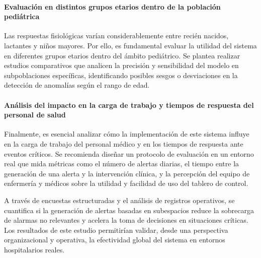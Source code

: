 \paragraph{Evaluación en distintos grupos etarios dentro de la población pediátrica}

Las respuestas fisiológicas varían considerablemente entre recién nacidos, lactantes y niños mayores. Por ello, es fundamental evaluar la utilidad del sistema en diferentes grupos etarios dentro del ámbito pediátrico. Se plantea realizar estudios comparativos que analicen la precisión y sensibilidad del modelo en subpoblaciones específicas, identificando posibles sesgos o desviaciones en la detección de anomalías según el rango de edad.

\paragraph{Análisis del impacto en la carga de trabajo y tiempos de respuesta del personal de salud}

Finalmente, es esencial analizar cómo la implementación de este sistema influye en la carga de trabajo del personal médico y en los tiempos de respuesta ante eventos críticos. Se recomienda diseñar un protocolo de evaluación en un entorno real que mida métricas como el número de alertas diarias, el tiempo entre la generación de una alerta y la intervención clínica, y la percepción del equipo de enfermería y médicos sobre la utilidad y facilidad de uso del tablero de control.

A través de encuestas estructuradas y el análisis de registros operativos, se cuantifica si la generación de alertas basadas en subespacios reduce la sobrecarga de alarmas no relevantes y acelera la toma de decisiones en situaciones críticas. Los resultados de este estudio permitirían validar, desde una perspectiva organizacional y operativa, la efectividad global del sistema en entornos hospitalarios reales.